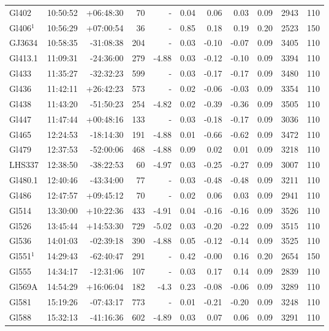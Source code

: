 \documentclass{aa}
\begin{document}
{\begin{longtable}{l r r r r r r r r r r}
Gl402 & 10:50:52 & +06:48:30 & 70 &    - & 0.04 & 0.06 & 0.03 & 0.09 & 2943 &  110 \\
Gl406$^1$ & 10:56:29 & +07:00:54 & 36 &    - & 0.85 & 0.18 & 0.19 & 0.20 & 2523 &  150 \\
GJ3634 & 10:58:35 & -31:08:38 & 204 &    - & 0.03 & -0.10 & -0.07 & 0.09 & 3405 &  110 \\
Gl413.1 & 11:09:31 & -24:36:00 & 279 & -4.88 & 0.03 & -0.12 & -0.10 & 0.09 & 3394 &  110 \\
Gl433 & 11:35:27 & -32:32:23 & 599 &    - & 0.03 & -0.17 & -0.17 & 0.09 & 3480 &  110 \\
Gl436 & 11:42:11 & +26:42:23 & 573 &    - & 0.02 & -0.06 & -0.03 & 0.09 & 3354 &  110 \\
Gl438 & 11:43:20 & -51:50:23 & 254 & -4.82 & 0.02 & -0.39 & -0.36 & 0.09 & 3505 &  110 \\
Gl447 & 11:47:44 & +00:48:16 & 133 &    - & 0.03 & -0.18 & -0.17 & 0.09 & 3036 &  110 \\
Gl465 & 12:24:53 & -18:14:30 & 191 & -4.88 & 0.01 & -0.66 & -0.62 & 0.09 & 3472 &  110 \\
Gl479 & 12:37:53 & -52:00:06 & 468 & -4.88 & 0.09 & 0.02 & 0.01 & 0.09 & 3218 &  110 \\
LHS337 & 12:38:50 & -38:22:53 & 60 & -4.97 & 0.03 & -0.25 & -0.27 & 0.09 & 3007 &  110 \\
Gl480.1 & 12:40:46 & -43:34:00 & 77 &    - & 0.03 & -0.48 & -0.48 & 0.09 & 3211 &  110 \\
Gl486 & 12:47:57 & +09:45:12 & 70 &    - & 0.02 & 0.06 & 0.03 & 0.09 & 2941 &  110 \\
Gl514 & 13:30:00 & +10:22:36 & 433 & -4.91 & 0.04 & -0.16 & -0.16 & 0.09 & 3526 &  110 \\
Gl526 & 13:45:44 & +14:53:30 & 729 & -5.02 & 0.03 & -0.20 & -0.22 & 0.09 & 3515 &  110 \\
Gl536 & 14:01:03 & -02:39:18 & 390 & -4.88 & 0.05 & -0.12 & -0.14 & 0.09 & 3525 &  110 \\
Gl551$^1$ & 14:29:43 & -62:40:47 & 291 &    - & 0.42 & -0.00 & 0.16 & 0.20 & 2654 &  150 \\
Gl555 & 14:34:17 & -12:31:06 & 107 &    - & 0.03 & 0.17 & 0.14 & 0.09 & 2839 &  110 \\
Gl569A & 14:54:29 & +16:06:04 & 182 & -4.3 & 0.23 & -0.08 & -0.06 & 0.09 & 3289 &  110 \\
Gl581 & 15:19:26 & -07:43:17 & 773 &    - & 0.01 & -0.21 & -0.20 & 0.09 & 3248 &  110 \\
Gl588 & 15:32:13 & -41:16:36 & 602 & -4.89 & 0.03 & 0.07 & 0.06 & 0.09 & 3291 &  110 \\

\end{longtable}}
\end{document}
